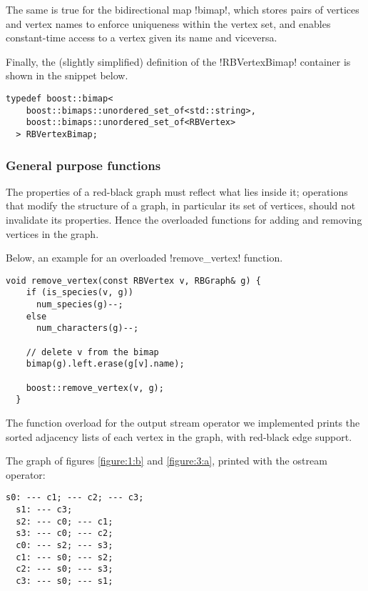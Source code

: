 The same is true for the bidirectional map !bimap!, which stores pairs of vertices and vertex names to enforce uniqueness within the vertex set, and enables constant-time access to a vertex given its name and viceversa.

Finally, the (slightly simplified) definition of the !RBVertexBimap! container is shown in the snippet below.

\begin{lstlisting}[belowskip=0pt, moreemph={RBVertex}]
  typedef boost::bimap<
    boost::bimaps::unordered_set_of<std::string>,
    boost::bimaps::unordered_set_of<RBVertex>
  > RBVertexBimap;
\end{lstlisting}

\subsubsection*{General purpose functions}

The properties of a red-black graph must reflect what lies inside it; operations that modify the structure of a graph, in particular its set of vertices, should not invalidate its properties.
Hence the overloaded functions for adding and removing vertices in the graph.

Below, an example for an overloaded !remove_vertex! function.

\begin{lstlisting}[moreemph={RBVertex, RBGraph},
                   moreemph={[2] remove_vertex}]
  void remove_vertex(const RBVertex v, RBGraph& g) {
    if (is_species(v, g))
      num_species(g)--;
    else
      num_characters(g)--;

    // delete v from the bimap
    bimap(g).left.erase(g[v].name);

    boost::remove_vertex(v, g);
  }
\end{lstlisting}

The function overload for the output stream operator we implemented prints the sorted adjacency lists of each vertex in the graph, with red-black edge support.

The graph \grb{} of figures \ref{figure:1:b} and \ref{figure:3:a}, printed with the ostream operator:

\begin{lstlisting}[keywordstyle=\color{block_fg}]
  s0: --- c1; --- c2; --- c3;
  s1: --- c3;
  s2: --- c0; --- c1;
  s3: --- c0; --- c2;
  c0: --- s2; --- s3;
  c1: --- s0; --- s2;
  c2: --- s0; --- s3;
  c3: --- s0; --- s1;
\end{lstlisting}

